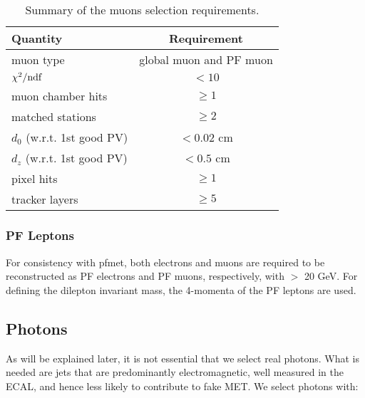 \begin{table}[htb]
\begin{center}
\caption{\label{table:muons} Summary of the muons selection requirements.}
\begin{tabular}{l|c}
\hline
              Quantity   &     Requirement \\
\hline
muon type & global muon and PF muon \\
$\chi^2/\rm{ndf}$ & $<10$   \\
muon chamber hits & $\geq1$ \\
matched stations  & $\geq2$ \\
$d_{0}$ (w.r.t. 1st good PV)            & $<0.02$ cm  \\
$d_{z}$ (w.r.t. 1st good PV)            & $<0.5$ cm   \\
pixel hits & $\geq1$ \\
tracker layers & $\geq5$ \\
\hline
\end{tabular}
\end{center}
\end{table}

\subsubsection{PF Leptons}

For consistency with pfmet, both electrons and muons are required to be reconstructed as PF electrons and PF muons, respectively,
with \pt $>$ 20 GeV. For defining the dilepton invariant mass, the 4-momenta of the PF leptons are used.

\subsection{Photons}
\label{sec:phosel}

As will be explained later, it is not essential that we select real photons. 
What is needed are jets that are predominantly electromagnetic, well measured in the ECAL, and hence less likely to contribute to fake MET. We select photons with:

